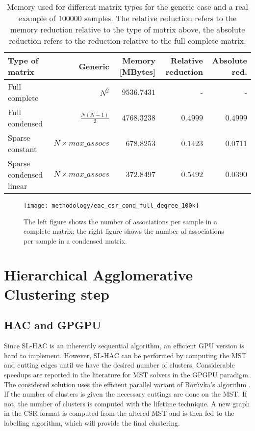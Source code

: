 \begin{table}[hbtp]
\centering
\caption{Memory used for different matrix types for the generic case and a real example of 100000 samples. The relative reduction refers to the memory reduction relative to the type of matrix above, the absolute reduction refers to the reduction relative to the full complete matrix.}
\label{tab:mat type memory}
\begin{tabular}{l|r|r|r|r}
\toprule
Type of matrix          & Generic                & Memory {[}MBytes{]}    & Relative reduction & Absolute red. \\
\midrule
Full complete           & $N^2$                  & $9536.7431$              & -                  & -             \\
Full condensed          & $\frac{N(N-1)}{2}$     & $4768.3238$              & $0.4999$     & $0.4999$      \\
Sparse constant         & $N \times max\_assocs$ & $678.8253$               & $0.1423$           & $0.0711$      \\
Sparse condensed linear & $N \times max\_assocs$ & $372.8497$               & $0.5492$           & $0.0390$      \\
\bottomrule
\end{tabular}
\end{table}


\begin{figure}[hbtp]
\centering
\texttt{[image: methodology/eac\_csr\_cond\_full\_degree\_100k]}
\caption{The left figure shows the number of associations per sample in a complete matrix; the right figure shows the number of associations per sample in a condensed matrix.}
\label{fig:coassoc degree}
\end{figure}




\section{Hierarchical Agglomerative Clustering step}

\subsection{HAC and GPGPU}
Since SL-HAC is an inherently sequential algorithm, an efficient GPU version is hard to implement.
However, SL-HAC can be performed by computing the MST and cutting edges until we have the desired number of clusters.
Considerable speedups are reported in the literature for MST solvers in the GPGPU paradigm.
The considered solution uses the efficient parallel variant of Borůvka's algorithm \cite{Sousa2015}. 
If the number of clusters is given the necessary cuttings are done on the MST. 
If not, the number of clusters is computed with the lifetime technique. 
A new graph in the CSR format is computed from the altered MST and is then fed to the labelling algorithm, which will provide the final clustering.

